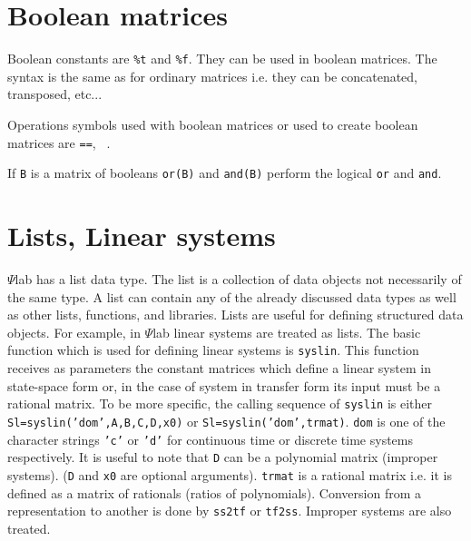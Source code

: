 \section{Boolean matrices}

Boolean constants are {\tt \%t} and {\tt \%f}. They can be used in
boolean matrices. The syntax is the same as for ordinary matrices i.e.
they can be concatenated, transposed, etc...

Operations symbols used with boolean matrices or used to create
boolean matrices are {\tt ==}, {\tt ~}.

If {\tt B} is a matrix of booleans {\tt or(B)} and {\tt and(B)} 
perform the logical {\tt or} and {\tt and}.

\section{Lists, Linear systems}
\label{s2.5}

	$\Psi$lab has a list data type.  The list is a collection of data
objects not necessarily of the same type.  A list can contain any of
the already discussed data types as well as other lists, functions, and
libraries.  Lists are useful for defining structured data objects.
For example, in $\Psi$lab linear systems are treated as lists.
The basic function which is used for defining linear systems is {\tt syslin}.
This function receives as parameters the constant matrices which
define a linear system in state-space form or, in the case of
system in transfer form its input must be a rational matrix.
To be more specific, the calling sequence of {\tt syslin} is
either {\tt Sl=syslin('dom',A,B,C,D,x0)} or {\tt Sl=syslin('dom',trmat)}.
{\tt dom} is one of the character strings {\tt 'c'} or {\tt 'd'}
for continuous time or discrete time systems respectively.
It is useful to note that {\tt D} can be a polynomial matrix 
(improper systems). ({\tt D} and {\tt x0} are optional arguments).
{\tt trmat} is a rational matrix i.e. it is defined as a matrix
of rationals (ratios of polynomials).
Conversion from a representation to another is done by {\tt ss2tf}
or {\tt tf2ss}. Improper systems are also treated.

